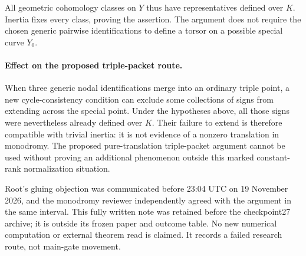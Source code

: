 All geometric cohomology classes on $Y$ thus have representatives defined
over $K$. Inertia fixes every class, proving the assertion. The argument
does not require the chosen generic pairwise identifications to define a
torsor on a possible special curve $Y_0$.

\paragraph{Effect on the proposed triple-packet route.}
When three generic nodal identifications merge into an ordinary triple
point, a new cycle-consistency condition can exclude some collections of
signs from extending across the special point. Under the hypotheses
above, all those signs were nevertheless already defined over $K$.
Their failure to extend is therefore compatible with trivial inertia:
it is not evidence of a nonzero translation in monodromy. The proposed
pure-translation triple-packet argument cannot be used without proving
an additional phenomenon outside this marked constant-rank normalization
situation.

Root's gluing objection was communicated before 23:04 UTC on
19 November 2026, and the monodromy reviewer independently agreed with
the argument in the same interval. This fully written note was retained
before the checkpoint27 archive; it is outside its frozen paper and
outcome table. No new numerical computation or external theorem read is
claimed. It records a failed research route, not main-gate movement.
